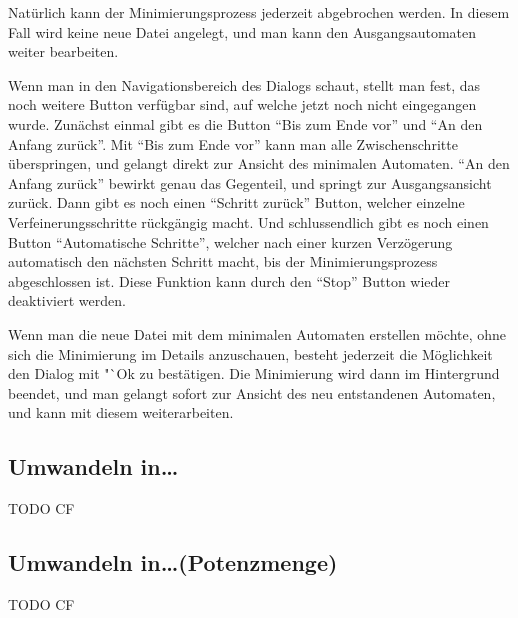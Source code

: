   Natürlich kann der Minimierungsprozess jederzeit abgebrochen werden. In
  diesem Fall wird keine neue Datei angelegt, und man kann den
  Ausgangsautomaten weiter bearbeiten. \vspace{10pt}
  
  Wenn man in den Navigationsbereich des Dialogs schaut, stellt man fest, das
  noch weitere Button verfügbar sind, auf welche jetzt noch nicht eingegangen
  wurde. Zunächst einmal gibt es die Button "`Bis zum Ende vor"' und "`An den
  Anfang zurück"'. Mit "`Bis zum Ende vor"' kann man alle Zwischenschritte
  überspringen, und gelangt direkt zur Ansicht des minimalen Automaten. "`An den
  Anfang zurück"' bewirkt genau das Gegenteil, und springt zur Ausgangsansicht
  zurück. Dann gibt es noch einen "`Schritt zurück"' Button, welcher einzelne
  Verfeinerungsschritte rückgängig macht. Und schlussendlich gibt es noch einen
  Button "`Automatische Schritte"', welcher nach einer kurzen Verzögerung
  automatisch den nächsten Schritt macht, bis der Minimierungsprozess
  abgeschlossen ist. Diese Funktion kann durch den "`Stop"' Button wieder
  deaktiviert werden.\vspace{10pt}
  
  Wenn man die neue Datei mit dem minimalen Automaten erstellen möchte, ohne
  sich die Minimierung im Details anzuschauen, besteht jederzeit die
  Möglich\-keit den Dialog mit "`Ok zu bestätigen. Die Minimierung wird dann im
  Hintergrund beendet, und man gelangt sofort zur Ansicht des neu entstandenen
  Automaten, und kann mit diesem weiterarbeiten.
  
  
\subsection{Umwandeln in\ldots}
  
  TODO CF
  
\subsection{Umwandeln in\ldots (Potenzmenge)}
  
  TODO CF
  
  
